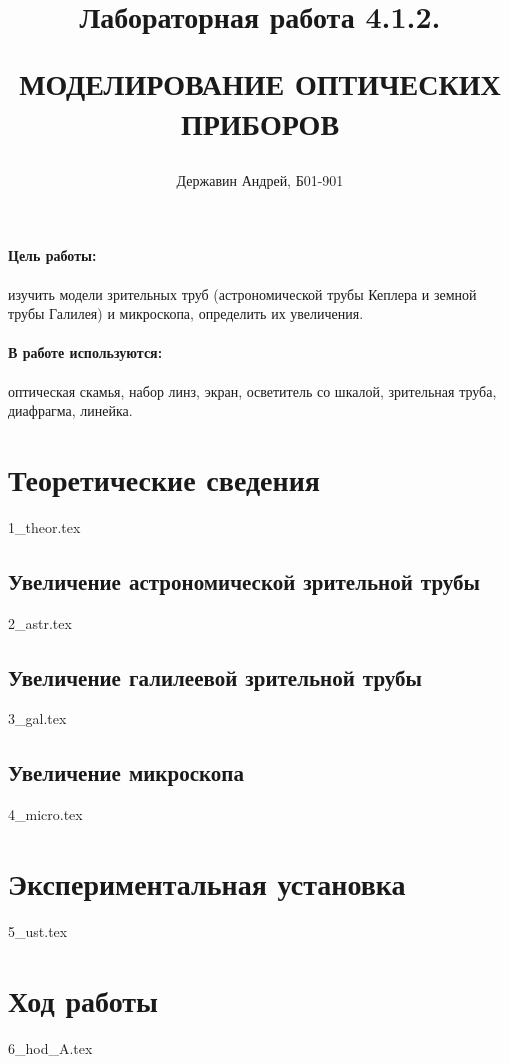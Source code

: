 \documentclass[a5paper,10pt, twoside]{article} %
\title
{
\hfill \break	\hfill \break
\hfill \break	\hfill \break
Лабораторная работа 4.1.2.

МОДЕЛИРОВАНИЕ ОПТИЧЕСКИХ ПРИБОРОВ
}
\author{Державин Андрей, Б01-901}
\begin{document}
\maketitle


\thispagestyle{empty} %

\newpage

\tableofcontents %
\thispagestyle{plain}
\newpage


\paragraph{Цель работы:}

изучить модели зрительных труб (астрономической трубы Кеплера и земной трубы Галилея) и микроскопа, 
определить их увеличения.

\paragraph{В работе используются:}

оптическая скамья, набор линз, экран, осветитель со шкалой, зрительная труба, диафрагма, линейка.

\section{Теоретические сведения}
{1_theor.tex}

  \subsection{Увеличение астрономической зрительной трубы}
  {2_astr.tex}

  \subsection{Увеличение галилеевой зрительной трубы}
  {3_gal.tex}

  \subsection{Увеличение микроскопа}
  {4_micro.tex}

\section{Экспериментальная установка}
{5_ust.tex}
\newpage
\section{Ход работы}
{6_hod_A.tex}
\newpage
\end{document}
